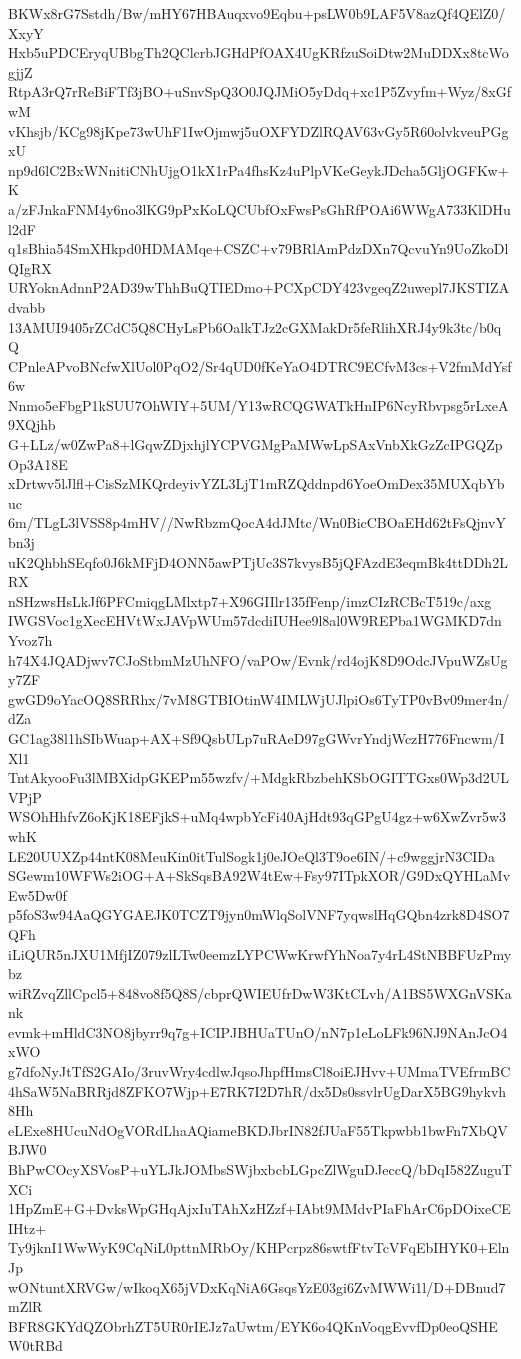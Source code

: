 BKWx8rG7Sstdh/Bw/mHY67HBAuqxvo9Eqbu+psLW0b9LAF5V8azQf4QElZ0/XxyY
Hxb5uPDCEryqUBbgTh2QClcrbJGHdPfOAX4UgKRfzuSoiDtw2MuDDXx8tcWogjjZ
RtpA3rQ7rReBiFTf3jBO+uSnvSpQ3O0JQJMiO5yDdq+xc1P5Zvyfm+Wyz/8xGfwM
vKhsjb/KCg98jKpe73wUhF1IwOjmwj5uOXFYDZlRQAV63vGy5R60olvkveuPGgxU
np9d6lC2BxWNnitiCNhUjgO1kX1rPa4fhsKz4uPlpVKeGeykJDcha5GljOGFKw+K
a/zFJnkaFNM4y6no3lKG9pPxKoLQCUbfOxFwsPsGhRfPOAi6WWgA733KlDHul2dF
q1sBhia54SmXHkpd0HDMAMqe+CSZC+v79BRlAmPdzDXn7QcvuYn9UoZkoDlQIgRX
URYoknAdnnP2AD39wThhBuQTIEDmo+PCXpCDY423vgeqZ2uwepl7JKSTIZAdvabb
13AMUI9405rZCdC5Q8CHyLsPb6OalkTJz2cGXMakDr5feRlihXRJ4y9k3tc/b0qQ
CPnleAPvoBNcfwXlUol0PqO2/Sr4qUD0fKeYaO4DTRC9ECfvM3cs+V2fmMdYsf6w
Nnmo5eFbgP1kSUU7OhWIY+5UM/Y13wRCQGWATkHnIP6NcyRbvpsg5rLxeA9XQjhb
G+LLz/w0ZwPa8+lGqwZDjxhjlYCPVGMgPaMWwLpSAxVnbXkGzZcIPGQZpOp3A18E
xDrtwv5lJlfl+CisSzMKQrdeyivYZL3LjT1mRZQddnpd6YoeOmDex35MUXqbYbuc
6m/TLgL3lVSS8p4mHV//NwRbzmQocA4dJMtc/Wn0BicCBOaEHd62tFsQjnvYbn3j
uK2QhbhSEqfo0J6kMFjD4ONN5awPTjUc3S7kvysB5jQFAzdE3eqmBk4ttDDh2LRX
nSHzwsHsLkJf6PFCmiqgLMlxtp7+X96GIIlr135fFenp/imzCIzRCBcT519c/axg
IWGSVoc1gXecEHVtWxJAVpWUm57dcdiIUHee9l8al0W9REPba1WGMKD7dnYvoz7h
h74X4JQADjwv7CJoStbmMzUhNFO/vaPOw/Evnk/rd4ojK8D9OdcJVpuWZsUgy7ZF
gwGD9oYacOQ8SRRhx/7vM8GTBIOtinW4IMLWjUJlpiOs6TyTP0vBv09mer4n/dZa
GC1ag38l1hSIbWuap+AX+Sf9QsbULp7uRAeD97gGWvrYndjWczH776Fncwm/IXl1
TntAkyooFu3lMBXidpGKEPm55wzfv/+MdgkRbzbehKSbOGITTGxs0Wp3d2ULVPjP
WSOhHhfvZ6oKjK18EFjkS+uMq4wpbYcFi40AjHdt93qGPgU4gz+w6XwZvr5w3whK
LE20UUXZp44ntK08MeuKin0itTulSogk1j0eJOeQl3T9oe6IN/+c9wggjrN3CIDa
SGewm10WFWs2iOG+A+SkSqsBA92W4tEw+Fsy97ITpkXOR/G9DxQYHLaMvEw5Dw0f
p5foS3w94AaQGYGAEJK0TCZT9jyn0mWlqSolVNF7yqwslHqGQbn4zrk8D4SO7QFh
iLiQUR5nJXU1MfjIZ079zlLTw0eemzLYPCWwKrwfYhNoa7y4rL4StNBBFUzPmybz
wiRZvqZllCpcl5+848vo8f5Q8S/cbprQWIEUfrDwW3KtCLvh/A1BS5WXGnVSKank
evmk+mHldC3NO8jbyrr9q7g+ICIPJBHUaTUnO/nN7p1eLoLFk96NJ9NAnJcO4xWO
g7dfoNyJtTfS2GAIo/3ruvWry4cdlwJqsoJhpfHmsCl8oiEJHvv+UMmaTVEfrmBC
4hSaW5NaBRRjd8ZFKO7Wjp+E7RK7I2D7hR/dx5Ds0ssvlrUgDarX5BG9hykvh8Hh
eLExe8HUcuNdOgVORdLhaAQiameBKDJbrIN82fJUaF55Tkpwbb1bwFn7XbQVBJW0
BhPwCOcyXSVosP+uYLJkJOMbsSWjbxbcbLGpcZlWguDJeccQ/bDqI582ZuguTXCi
1HpZmE+G+DvksWpGHqAjxIuTAhXzHZzf+IAbt9MMdvPIaFhArC6pDOixeCEIHtz+
Ty9jknI1WwWyK9CqNiL0pttnMRbOy/KHPcrpz86swtfFtvTcVFqEbIHYK0+ElnJp
wONtuntXRVGw/wIkoqX65jVDxKqNiA6GsqsYzE03gi6ZvMWWi1l/D+DBnud7mZlR
BFR8GKYdQZObrhZT5UR0rIEJz7aUwtm/EYK6o4QKnVoqgEvvfDp0eoQSHEW0tRBd
